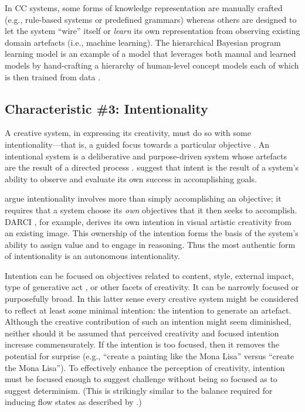 \documentclass[phd,electronic,oneside,twosidetoc,letterpaper,chaptercenter,parttop,lol,lof,lot]{byumsphd}
\begin{document}
In CC systems, some forms of knowledge representation are manually crafted (e.g., rule-based systems or predefined grammars) whereas others are designed to let the system ``wire'' itself or \textit{learn} its own representation from observing existing domain artefacts (i.e., machine learning). The hierarchical Bayesian program learning model is an example of a model that leverages both manual and learned models by hand-crafting a hierarchy of human-level concept models each of which is then trained from data \citep{Lake2015,Bodily2017ComputationalLearning}.

\subsection{Characteristic \#3: Intentionality}

A creative system, in expressing its creativity, must do so with some intentionality---that is, a guided focus towards a particular objective \citep{Ventura2016,Ackerman2017TeachingCreativity}. An intentional system is a deliberative and purpose-driven system whose artefacts are the result of a directed process \citep{Ventura2016}. \cite{Ackerman2017TeachingCreativity} suggest that intent is the result of a system's ability to observe and evaluate its own success in accomplishing goals. 

\cite{guckelsberger2017addressing} argue intentionality involves more than simply accomplishing an objective; it requires that a system choose its \textit{own} objectives that it then seeks to accomplish. DARCI \citep{norton2013finding}, for example, derives its own intention in visual artistic creativity from an existing image. This ownership of the intention forms the basis of the system's ability to assign value and to engage in reasoning. Thus the most authentic form of intentionality is an autonomous intentionality.

Intention can be focused on objectives related to content, style, external impact, type of generative act \citep{Colton2011}, or other facets of creativity. It can be narrowly focused or purposefully broad. In this latter sense every creative system might be considered to reflect at least some minimal intention: the intention to generate an artefact. Although the creative contribution of such an intention might seem diminished, neither should it be assumed that perceived creativity and focused intention increase commensurately. If the intention is too focused, then it removes the potential for surprise (e.g., ``create a painting like the Mona Lisa'' versus ``create the Mona Lisa''). To effectively enhance the perception of creativity, intention must be focused enough to suggest challenge without being so focused as to suggest determinism. (This is strikingly similar to the balance required for inducing flow states as described by \citep{csikszentmihalyi1997flow}.)
\end{document}
